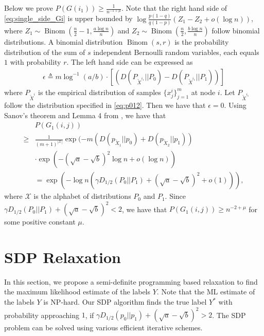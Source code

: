 \documentclass[conference]{IEEEtran}
\DeclareMathOperator{\Binom}{Binom}
\begin{document}
		Below we prove $P(G(i_1)) \geq \frac{1}{n^{-1+\mu}}$. Note that the right hand side of \eqref{eq:single_side_Gi} is upper bounded by $\log \frac{p(1-q)}{q(1-p)}(Z_1-Z_2+o(\log n))$, where $Z_1\sim \Binom(\frac{n}{2}-1,\frac{a\log n}{n})$ and $Z_2\sim \Binom(\frac{n}{2},\frac{b\log n}{n})$ 
		follow binomial distributions. A binomial distribution $\Binom(s,r)$ is the probability distribution of the sum of $s$ independent Bernoulli random variables, each equals $1$ with probability $r$.
		The left hand side can be expressed as
		\begin{align*}
			\epsilon\triangleq m\log^{-1}( a /b)\cdot [(D(P_{\widetilde{X}^{i_1}} || P_0) - D(P_{\widetilde{X}^{i_1}} || P_1))]
		\end{align*}
		where $P_{\widetilde{X}^i}$ is the empirical distribution of samples $\{x^i_j\}^m_{j=1}$ at node $i$. Let $P_{\widetilde{X}^{i_1}}$ follow the distribution specified in \eqref{eq:p012}. Then we have that $\epsilon =0$. Using Sanov's theorem and Lemma 4 from \cite{abbe2015exact}, we have that
		\begin{align*}
			&P(G_1(i,j))\\
			\geq &\frac{1}{(m+1)^{|\mathcal{X}|}} \exp(-m(D(p_{\widetilde{X}_1} || p_0) + D(p_{\widetilde{X}_2} || p_1)) \\
			&\cdot\exp(- (\sqrt{a} - \sqrt{b})^2\log n+o(\log n) ) \\
			& = \exp(-\log n (\gamma D_{1/2}(P_0||P_1) + (\sqrt{a} - \sqrt{b})^2+ o(1))),
		\end{align*}
		where $\mathcal{X}$ is the alphabet of distributions $P_0$ and $P_1$.
		Since $\gamma D_{1/2}(P_0||P_1) + (\sqrt{a} - \sqrt{b})^2<2$, we have that $P(G_1(i,j))\ge n^{-2+\mu}$ for some positive constant $\mu$.
	

	
	\section{SDP Relaxation}\label{s:sdp}
	In this section, we propose a semi-definite programming based relaxation to find the maximum likelihood estimate of the labels $Y$. Note that
	the ML estimate of the labels $Y$ is NP-hard. 
	Our SDP algorithm finds the true label $Y^*$ with probability approaching $1$, if
	$\gamma D_{1/2}(p_0||p_1) + (\sqrt{a} - \sqrt{b})^2 > 2$.
	The SDP problem can be solved using various efficient iterative schemes.
	
\end{document}
